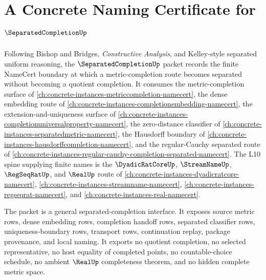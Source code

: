 \chapter{A Concrete Naming Certificate for $\SeparatedCompletionUp$}
\label{ch:concrete-instances-separatedcompletion-namecert}

Following Bishop and Bridges, \emph{Constructive Analysis}, and Kelley-style separated uniform reasoning, the $\SeparatedCompletionUp$ packet records the finite NameCert boundary at which a metric-completion route becomes separated without becoming a quotient completion. It consumes the metric-completion surface of \autoref{ch:concrete-instances-metriccompletion-namecert}, the dense embedding route of \autoref{ch:concrete-instances-completionembedding-namecert}, the extension-and-uniqueness surface of \autoref{ch:concrete-instances-completionuniversalproperty-namecert}, the zero-distance classifier of \autoref{ch:concrete-instances-separatedmetric-namecert}, the Hausdorff boundary of \autoref{ch:concrete-instances-hausdorffcompletion-namecert}, and the regular-Cauchy separated route of \autoref{ch:concrete-instances-regular-cauchy-completion-separated-namecert}. The L10 spine supplying finite names is the $\DyadicRatCoreUp$, $\StreamNameUp$, $\RegSeqRatUp$, and $\RealUp$ route of \autoref{ch:concrete-instances-dyadicratcore-namecert}, \autoref{ch:concrete-instances-streamname-namecert}, \autoref{ch:concrete-instances-regseqrat-namecert}, and \autoref{ch:concrete-instances-real-namecert}.

The packet is a general separated-completion interface. It exposes source metric rows, dense embedding rows, completion handoff rows, separated classifier rows, uniqueness-boundary rows, transport rows, continuation replay, package provenance, and local naming. It exports no quotient completion, no selected representative, no host equality of completed points, no countable-choice schedule, no ambient $\RealUp$ completeness theorem, and no hidden complete metric space.

